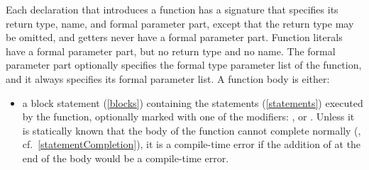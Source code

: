 \documentclass[makeidx]{article}
\begin{document}
\LMHash{}%
Each declaration that introduces a function has a signature that specifies
its return type, name, and formal parameter part,
except that the return type may be omitted,
and getters never have a formal parameter part.
Function literals have a formal parameter part, but no return type and no name.
The formal parameter part optionally specifies
the formal type parameter list of the function,
and it always specifies its formal parameter list.
A function body is either:
\begin{itemize}
\item
  a block statement (\ref{blocks}) containing
  the statements (\ref{statements}) executed by the function,
  optionally marked with one of the modifiers:
  \ASYNC, \code{\ASYNC*} or \code{\SYNC*}.
  Unless it is statically known that the body of the function
  cannot complete normally
  (,
  cf.~\ref{statementCompletion}),
  it is a compile-time error if
  the addition of \code{\RETURN;} at the end of the body
  would be a compile-time error.



\end{itemize}
\end{document}
